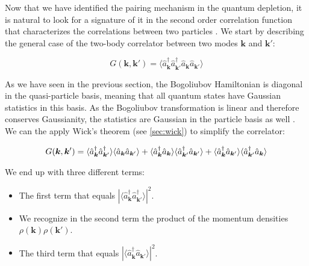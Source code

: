 
\label{sec:2nd_order_bogo}

Now that we have identified the \kmk pairing mechanism in the quantum depletion, it is natural to look for a signature of it in the second order correlation function that characterizes the correlations between two particles \cite{butera2020,mathey2009noise,toth2008theory}. We start by describing the general case of the two-body correlator between two modes $\bm{k}$ and $\bm{k'}$:

\begin{equation}
    G(\bm{k},\bm{k}')=\langle \hat{a}^{\dagger}_{\bm{k}} \hat{a}^{\dagger}_{\bm k'} \hat{a}_{\bm k} \hat{a}_{\bm {k}'} \rangle
\end{equation}

As we have seen in the previous section, the Bogoliubov Hamiltonian is diagonal in the quasi-particle basis, meaning that all quantum states have Gaussian statistics in this basis. As the Bogoliubov transformation is linear and therefore conserves Gaussianity, the statistics are Gaussian in the particle basis as well \cite{butera2020}. We can the apply Wick's theorem (see \ref{sec:wick}) to simplify the correlator:

\begin{equation}
    G(\bm{k},\bm{k}')=\langle \hat{a}^{\dagger}_{\bm k} \hat{a}^{\dagger}_{\bm {k}'} \rangle \langle\hat{a}_{\bm k} \hat{a}_{\bm {k}'}\rangle + \langle \hat{a}^{\dagger}_{\bm k} \hat{a}_{\bm k} \rangle \langle \hat{a}^{\dagger}_{\bm {k}'} \hat{a}_{\bm {k}'} \rangle + \langle \hat{a}^{\dagger}_{\bm k} \hat{a}_{\bm {k}'} \rangle \langle \hat{a}^{\dagger}_{\bm {k}'} \hat{a}_{\bm k} \rangle
    \label{eq:wick_bogo}
\end{equation}

We end up with three different terms:

\begin{itemize}
    \item The first term that equals $| \langle \hat{a}^{\dagger}_{\bm k} \hat{a}^{\dagger}_{\bm {k}'} \rangle |^2$.
    \item We recognize in the second term the product of the momentum densities $\rho(\bm{k}) \rho(\bm{k}')$.
    \item The third term that equals $| \langle \hat{a}^{\dagger}_{\bm k} \hat{a}_{\bm {k}'} \rangle |^2$. 
\end{itemize}

